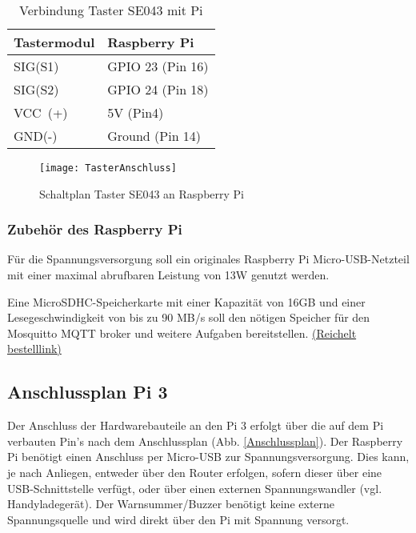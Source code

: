 \documentclass[a4paper,12pt]{article}
\begin{document}
\begin{table}[H]
	\centering
	\begin{tabular}{|p{5cm}|p{5cm}|} 
		\hline
		Tastermodul & Raspberry Pi\\ 
		\hline
		SIG(S1)                   & GPIO 23 \hspace{0,3cm}(Pin 16)\\
		\hline
		SIG(S2)                   & GPIO 24 \hspace{0,3cm}(Pin 18)\\
		\hline
		VCC~(+)   & 5V \hspace{1,45cm}(Pin\hspace{0,35cm}4)\\ 
		\hline
		GND(-)                   & Ground \hspace{0,6cm}(Pin 14)\\
		\hline
		
\end{tabular}
	\caption{Verbindung Taster SE043 mit Pi} 
\end{table}




	\begin{figure}[H]
	\centering
	\texttt{[image: TasterAnschluss]}
	\caption{Schaltplan Taster SE043 an Raspberry Pi}
	\label{TasterAnschluss}
\end{figure}

\subsubsection{Zubehör des Raspberry Pi}

Für die Spannungsversorgung soll ein originales Raspberry Pi Micro-USB-Netzteil mit einer maximal abrufbaren Leistung von 13W genutzt werden.\par

Eine MicroSDHC-Speicherkarte mit einer Kapazität von 16GB und einer Lesegeschwindigkeit von bis zu 90 MB/s soll den nötigen Speicher für den Mosquitto MQTT broker und weitere Aufgaben bereitstellen. \href{https://www.reichelt.de/sg/de/microsdhc-speicherkarte-16gb-transcend-class-10-uhs-i-ts16gusdcu1-p220722.html}{(Reichelt bestelllink)} 

\subsection{Anschlussplan Pi 3}
Der Anschluss der Hardwarebauteile an den Pi 3 erfolgt über die auf dem Pi verbauten Pin's nach dem Anschlussplan (Abb. \ref{Anschlussplan}). Der Raspberry Pi benötigt einen Anschluss per Micro-USB zur Spannungsversorgung. Dies kann, je nach Anliegen, entweder über den Router erfolgen, sofern dieser über eine USB-Schnittstelle verfügt, oder über einen externen Spannungswandler (vgl. Handyladegerät). Der Warnsummer/Buzzer benötigt keine externe Spannungsquelle und wird direkt über den Pi mit Spannung versorgt.
\end{document}
